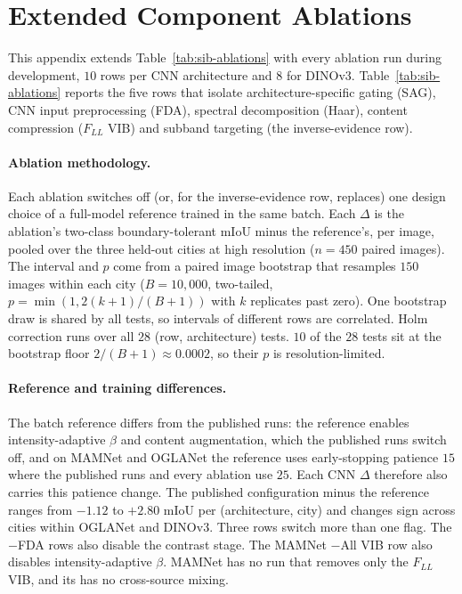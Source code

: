 \section{Extended \sib{} Component Ablations}
\label{app:sib-ablations}

This appendix extends Table~\ref{tab:sib-ablations} with every ablation run during \sib{} development, $10$ rows per CNN architecture and $8$ for DINOv3. Table~\ref{tab:sib-ablations} reports the five rows that isolate architecture-specific gating (SAG), CNN input preprocessing (FDA), spectral decomposition (Haar), content compression ($F_{LL}$ VIB) and subband targeting (the inverse-evidence row).

\paragraph{Ablation methodology.} Each ablation switches off (or, for the inverse-evidence row, replaces) one design choice of a full-model reference trained in the same batch. Each $\Delta$ is the ablation's two-class boundary-tolerant mIoU minus the reference's, per image, pooled over the three held-out cities at high resolution ($n = 450$ paired images). The interval and $p$ come from a paired image bootstrap that resamples $150$ images within each city ($B = 10{,}000$, two-tailed, $p = \min(1, 2(k+1)/(B+1))$ with $k$ replicates past zero). One bootstrap draw is shared by all tests, so intervals of different rows are correlated. Holm correction runs over all $28$ (row, architecture) tests. $10$ of the $28$ tests sit at the bootstrap floor $2/(B+1) \approx 0.0002$, so their $p$ is resolution-limited.

\paragraph{Reference and training differences.} The batch reference differs from the published \sib{} runs: the reference enables intensity-adaptive $\beta$ and content augmentation, which the published runs switch off, and on MAMNet and OGLANet the reference uses early-stopping patience $15$ where the published runs and every ablation use $25$. Each CNN $\Delta$ therefore also carries this patience change. The published configuration minus the reference ranges from $-1.12$ to $+2.80$ mIoU per (architecture, city) and changes sign across cities within OGLANet and DINOv3. Three rows switch more than one flag. The $-$FDA rows also disable the contrast stage. The MAMNet $-$All VIB row also disables intensity-adaptive $\beta$. MAMNet has no run that removes only the $F_{LL}$ VIB, and its \sib{} has no cross-source mixing.

